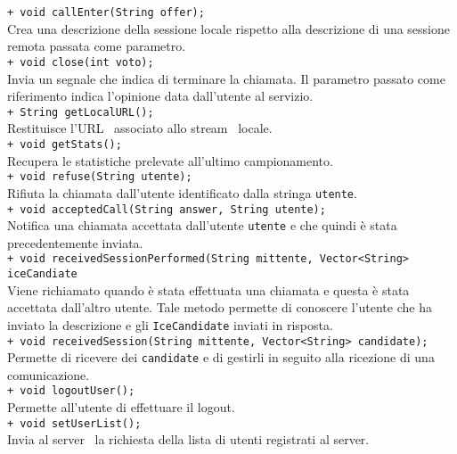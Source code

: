 {{\begin{sloppypar}
{{{\begin{itemize}
					\texttt{+ void callEnter(String offer);}\\
					Crea una descrizione della sessione locale rispetto alla descrizione di una sessione remota passata come parametro.\\

					\texttt{+ void close(int voto);}\\
					Invia un segnale che indica di terminare la chiamata. Il parametro passato come riferimento indica l'opinione data dall'utente al servizio.\\
					
					\texttt{+ String getLocalURL();}\\
					Restituisce l'URL\g~ associato allo stream\g~ locale.\\

					\texttt{+ void getStats();}\\
					Recupera le statistiche prelevate all'ultimo campionamento.\\

					\texttt{+ void refuse(String utente);} \\
					Rifiuta la chiamata dall'utente identificato dalla stringa \texttt{utente}.\\  
					
					\texttt{+ void acceptedCall(String answer, String utente);} \\
					Notifica una chiamata accettata dall'utente \texttt{utente} e che quindi è stata precedentemente inviata.\\
		
					\texttt{+ void receivedSessionPerformed(String mittente, Vector<String> iceCandiate}\\
					Viene richiamato quando è stata effettuata una chiamata e questa è stata accettata dall'altro utente. Tale metodo permette di conoscere l'utente che ha inviato la descrizione e gli \texttt{IceCandidate} inviati in risposta.\\
			
					\texttt{+ void receivedSession(String mittente, Vector<String> candidate);}\\
					Permette di ricevere dei \texttt{candidate} e di gestirli in seguito alla ricezione di una comunicazione.\\

					\texttt{+ void logoutUser();}\\
					Permette all'utente di effettuare il logout.\\
					
					\texttt{+ void setUserList();}\\
					Invia al server\g~ la richiesta della lista di utenti registrati al server\g.\\
					

\end{itemize}}}}
\end{sloppypar}}}
